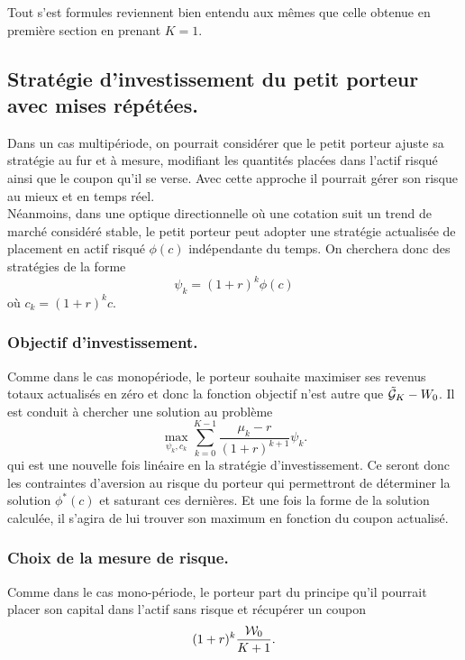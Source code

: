 \documentclass{article}
\numberwithin{equation}{section}
\begin{document}
Tout s'est formules reviennent bien entendu aux mêmes que celle obtenue en première section en prenant $K = 1$.

\subsection{Stratégie d'investissement du petit porteur avec mises répétées.}

Dans un cas multipériode, on pourrait considérer que le petit porteur ajuste sa stratégie au fur et à mesure, modifiant les quantités placées dans l'actif risqué ainsi que le coupon qu'il se verse. Avec cette approche il pourrait gérer son risque au mieux et en temps réel.\\

Néanmoins, dans une optique directionnelle où une cotation suit un trend de marché considéré stable, le petit porteur peut adopter une stratégie actualisée de placement en actif risqué $\phi(c)$ indépendante du temps. On cherchera donc des stratégies de la forme
$$
\psi_k = \left(1 + r\right)^k\phi\left( c \right)
$$
où $c_k = (1 + r)^k c$.

\subsubsection{Objectif d'investissement.}

Comme dans le cas monopériode, le porteur souhaite maximiser ses revenus totaux actualisés en zéro et donc la fonction objectif n'est autre que $\tilde{\mathcal{G}}_K - W_0$. Il est conduit à chercher une solution au problème
\begin{equation}
\max_{\psi_k, c_k}\sum_{k = 0}^{K - 1}\frac{\mu_k - r}{(1 + r)^{k + 1}}\psi_k.
\end{equation}
qui est une nouvelle fois linéaire en la stratégie d'investissement. Ce seront donc les contraintes d'aversion au risque du porteur qui permettront de déterminer la solution $\phi^*(c)$ et saturant ces dernières. Et une fois la forme de la solution calculée, il s'agira de lui trouver son maximum en fonction du coupon actualisé.

\subsubsection{Choix de la mesure de risque.} 

Comme dans le cas mono-période, le porteur part du principe qu'il pourrait placer son capital dans l'actif sans risque et récupérer un coupon 
\begin{equation}
(1 + r)^k\frac{\mathcal{W}_0}{K + 1}.
\end{equation}
\end{document}
